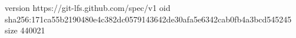 version https://git-lfs.github.com/spec/v1
oid sha256:171ca55b2190480e4c382dc0579143642de30afa5e6342cab0fb4a3bcd545245
size 440021
